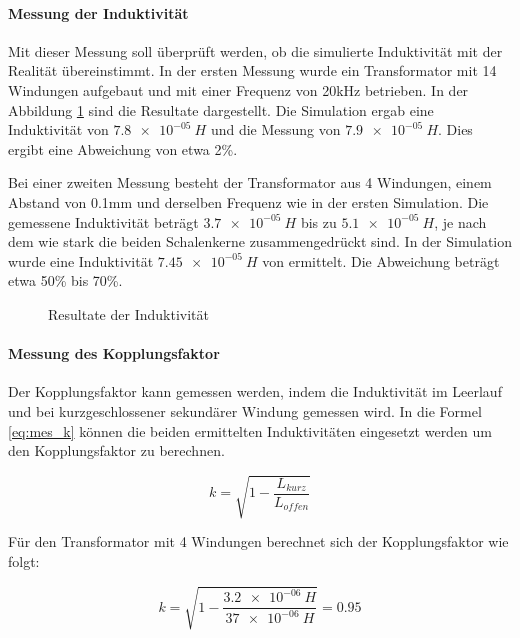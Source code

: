 \paragraph{Messung der Induktivität}
Mit dieser Messung soll überprüft werden, ob die simulierte Induktivität mit der Realität übereinstimmt. In der ersten Messung wurde ein Transformator mit 14 Windungen aufgebaut und mit einer Frequenz von 20kHz betrieben. In der Abbildung \ref{fig:mess_ind} sind die Resultate dargestellt. Die Simulation ergab eine Induktivität von $ \SI{7.8e-05}{H} $ und die Messung von $ \SI{7.9e-05}{H} $. Dies ergibt eine Abweichung von etwa 2\%. 

Bei einer zweiten Messung besteht der Transformator aus 4 Windungen, einem Abstand von 0.1mm und derselben Frequenz wie in der ersten Simulation. Die gemessene Induktivität beträgt $ \SI{3.7e-05}{H} $ bis zu $ \SI{5.1e-05}{H} $, je nach dem wie stark die beiden Schalenkerne zusammengedrückt sind. In der Simulation wurde eine Induktivität $ \SI{7.45e-05}{H} $ von ermittelt. Die Abweichung beträgt etwa 50\% bis 70\%. 

\begin{figure}[H]
	\centering
	\qquad
	\caption{Resultate der Induktivität}
	\label{fig:mess_ind}
\end{figure}

\paragraph{Messung des Kopplungsfaktor}
Der Kopplungsfaktor kann gemessen werden, indem die Induktivität im Leerlauf und bei kurzgeschlossener sekundärer Windung gemessen wird. In die Formel \ref{eq:mes_k} können die beiden ermittelten Induktivitäten eingesetzt werden um den Kopplungsfaktor zu berechnen.

\begin{equation}\label{eq:mes_k}
k = \sqrt{1-\frac{L_{kurz}}{L_{offen}}}
\end{equation}

Für den Transformator mit 4 Windungen berechnet sich der Kopplungsfaktor wie folgt:

\begin{equation}\label{eq:berechnung_k1}
k = \sqrt{1-\frac{\SI{3.2e-06}{H}}{\SI{37e-06}{H}}}=0.95
\end{equation}

